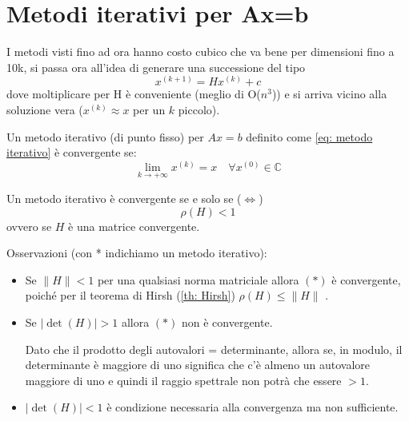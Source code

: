 \documentclass[12pt,a4paper,]{report}
\begin{document}
\section{Metodi iterativi per Ax=b}
I metodi visti fino ad ora hanno costo cubico che va bene per dimensioni fino a 10k, si passa ora all'idea di generare una successione del tipo
\begin{equation}
    \label{eq: metodo iterativo}
    x^{(k+1)} = Hx^{(k)}+c
\end{equation}
dove moltiplicare per H è conveniente (meglio di O($n^3$)) e si arriva vicino alla soluzione vera ($x^{(k)}\approx x$ per un $k$ piccolo).
\begin{definizione}
    Un metodo iterativo (di punto fisso) per $Ax=b$  definito come \autoref{eq: metodo iterativo} è convergente se:
    \[
    \lim_{k\to +\infty} x^{(k)} = x \quad \forall x^{(0)}\in \mathbb{C}
    \]
\end{definizione}
\begin{teorema}
    \label{th: metod it conv}
    Un metodo iterativo è convergente se e solo se ($\Leftrightarrow$)
    \[\rho(H) < 1\]
    ovvero se $H$ è una matrice convergente.
\end{teorema}
\noindent
Osservazioni (con * indichiamo un metodo iterativo):
\begin{itemize}
    \item Se $\|H\| < 1$ per una qualsiasi norma matriciale allora $(*)$ è convergente, poiché per il teorema di Hirsh (\ref{th: Hirsh}) $\rho(H) \leq \|H\|$ .
    \item Se $|\det(H)| > 1$ allora $(*)$ non è convergente.
    \begin{dimostrazionelibera}
        Dato che il prodotto degli autovalori = determinante, allora se, in modulo, il determinante è maggiore di uno significa che c'è almeno un autovalore maggiore di uno e quindi il raggio spettrale non potrà che essere $>1$.
    \end{dimostrazionelibera}
    \item $|\det(H)| < 1$ è condizione necessaria alla convergenza ma non sufficiente.
\end{itemize}
\end{document}
